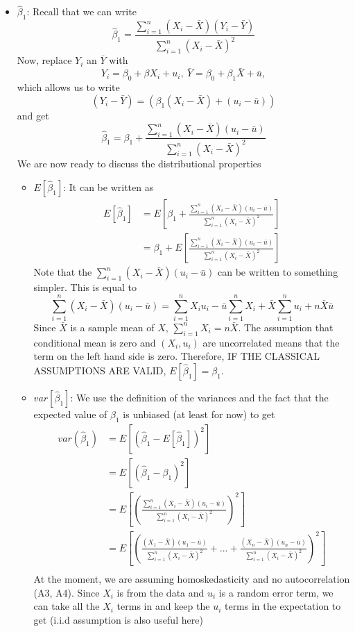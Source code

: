 \documentclass[12pt]{article}
\theoremstyle{definition}
\theoremstyle{property}
\theoremstyle{assumption}
\theoremstyle{example}
\theoremstyle{comment}
\begin{document}
\begin{itemize}
\item $\hat{\beta}_1$: Recall that we can write
\[
\hat{\beta}_1= \frac{\sum_{i=1}^n(X_i-\bar{X})(Y_i-\bar{Y})}{\sum_{i=1}^n(X_i-\bar{X})^2}
\]
Now, replace $Y_i$ an $\bar{Y}$ with 
\[
Y_i =\beta_0 + \beta X_i + u_i, \ \bar{Y} = \beta_0 + \beta_1\bar{X} + \bar{u},
\]
which allows us to write 
\[
(Y_i-\bar{Y}) = (\beta_1(X_i-\bar{X})+(u_i-\bar{u}))
\]
and get
\[
\hat{\beta}_1=\beta_1+  \frac{\sum_{i=1}^n(X_i-\bar{X})(u_i-\bar{u})}{\sum_{i=1}^n(X_i-\bar{X})^2}
\]
We are now ready to discuss the distributional properties
\begin{itemize}
\item $E[\hat{\beta}_1]$: It can be written as
\[
\begin{aligned}
E[\hat{\beta}_1]& = E\left[\beta_1+  \frac{\sum_{i=1}^n(X_i-\bar{X})(u_i-\bar{u})}{\sum_{i=1}^n(X_i-\bar{X})^2}\right]\\
&=\beta_1+ E\left[\frac{\sum_{i=1}^n(X_i-\bar{X})(u_i-\bar{u})}{\sum_{i=1}^n(X_i-\bar{X})^2}\right]
\end{aligned}
\]
Note that the $\sum_{i=1}^n(X_i-\bar{X})(u_i-\bar{u})$ can be written to something simpler. This is equal to
\[
\sum_{i=1}^n(X_i-\bar{X})(u_i-\bar{u})=\sum_{i=1}^nX_iu_i-\bar{u}\sum_{i=1}^n X_i+\bar{X}\sum_{i=1}^nu_i+n\bar{X}\bar{u}
\]
Since $\bar{X}$ is a sample mean of $X$, $\sum_{i=1}^nX_i=n\bar{X}$. The assumption that conditional mean is zero and $(X_i, u_i)$ are uncorrelated means that the term on the left hand side is zero. Therefore, IF THE CLASSICAL ASSUMPTIONS ARE VALID, $E[\hat{\beta}_1]=\beta_1$.
\item $var[\hat{\beta}_1]$: We use the definition of the variances and the fact that the expected value of $\hat{\beta}_1$ is unbiased (at least for now) to get
\[
\begin{aligned}
var(\hat{\beta}_1)&=E\left[\left(\hat{\beta}_1-E[\hat{\beta}_1]\right)^2\right] \\
&=E\left[\left(\hat{\beta}_1-{\beta}_1\right)^2\right]\\
&=E\left[\left( \frac{\sum_{i=1}^n(X_i-\bar{X})(u_i-\bar{u})}{\sum_{i=1}^n(X_i-\bar{X})^2} \right)^2\right]\\
&=E\left[\left(  \frac{(X_1-\bar{X})(u_1-\bar{u})}{\sum_{i=1}^n(X_i-\bar{X})^2}+...+\frac{(X_n-\bar{X})(u_n-\bar{u})}{\sum_{i=1}^n(X_i-\bar{X})^2} \right)^2\right]\\
\end{aligned}
\]
At the moment, we are assuming homoskedasticity and no autocorrelation (A3, A4). Since $X_i$ is from the data and $u_i$ is a random error term, we can take all the $X_i$ terms in and keep the $u_i$ terms in the expectation to get (i.i.d assumption is also useful here)

\end{itemize}
\end{itemize}
\end{document}
